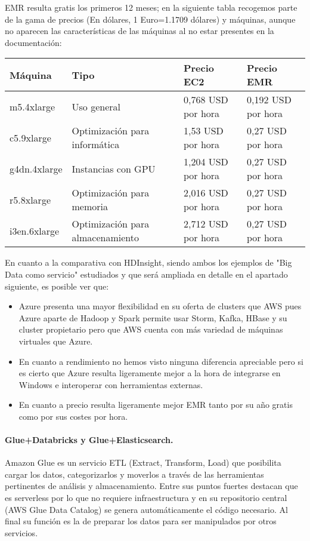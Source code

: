 \documentclass[11pt, a4paper]{article} %
\begin{document}
EMR resulta gratis los primeros 12 meses; en la siguiente tabla recogemos parte de la gama de precios (En dólares, 1 Euro=1.1709 dólares) y máquinas, aunque no aparecen las características de las máquinas al no estar presentes en la documentación: \cite{docaws}
\begin{table}[htb]
  \centering
  \begin{tabular}{ | P{3cm} | P{3cm} | P{3cm} | P{3cm} |}
    \hline
    Máquina & Tipo & Precio EC2 & Precio EMR \\ \hline
    m5.4xlarge & Uso general & 0,768 USD por hora & 0,192 USD por hora \\ \hline
    c5.9xlarge & Optimización para informática & 1,53 USD por hora & 0,27 USD por hora \\ \hline
    g4dn.4xlarge & Instancias con GPU & 1,204 USD por hora & 0,27 USD por hora \\ \hline
   r5.8xlarge & Optimización para memoria & 2,016 USD por hora & 0,27 USD por hora \\ \hline
   i3en.6xlarge & Optimización para almacenamiento & 2,712 USD por hora & 0,27 USD por hora \\ \hline
  \end{tabular}
\end{table}

En cuanto a la comparativa con HDInsight, siendo ambos los ejemplos de "Big Data como servicio" estudiados y que será ampliada en detalle en el apartado siguiente, es posible ver que:
\begin{itemize}
\item Azure presenta una mayor flexibilidad en su oferta de clusters que AWS pues Azure aparte de Hadoop y Spark permite usar Storm, Kafka, HBase y su cluster propietario pero que AWS cuenta con más variedad de máquinas virtuales que Azure.
\item En cuanto a rendimiento no hemos visto ninguna diferencia apreciable pero si es cierto que Azure resulta ligeramente mejor a la hora de integrarse en Windows e interoperar con herramientas externas.
\item En cuanto a precio resulta ligeramente mejor EMR tanto por su año gratis como por sus costes por hora.
\end{itemize}
\paragraph{Glue+Databricks y Glue+Elasticsearch.}
Amazon Glue es un servicio ETL (Extract, Transform, Load) que posibilita cargar los datos, categorizarlos y moverlos a través de las herramientas pertinentes de análisis y almacenamiento. Entre sus puntos fuertes destacan que es serverless por lo que no requiere infraestructura y en su repositorio central (AWS Glue Data Catalog) se genera automáticamente el código necesario. Al final su función es la de preparar los datos para ser manipulados por otros servicios. \cite{docaws}
\end{document}
